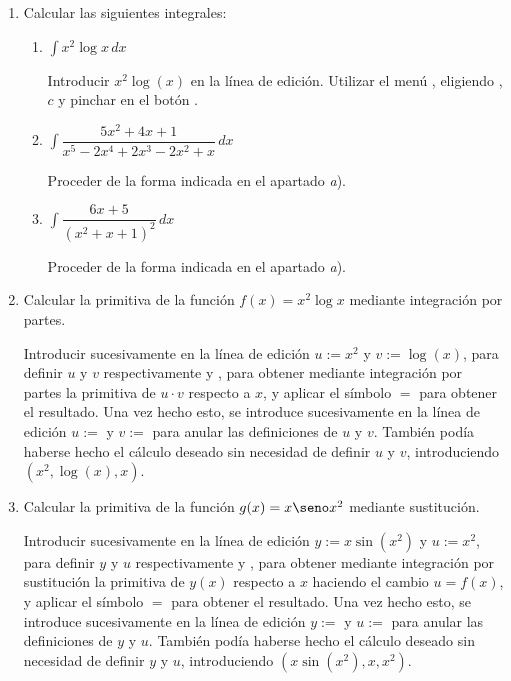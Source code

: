 \begin{enumerate}[leftmargin=*]
\item Calcular las siguientes integrales:

\begin{enumerate}
\item $ \int{x^{2} \log{x}\,dx}$

\begin{indication}
{Introducir $x^{2}\log(x)$ en la línea de edición. Utilizar el menú
, eligiendo ,
 $c$ y pinchar en el botón . }
\end{indication}

\item $ \int{\dfrac{5x^{2}+4x+1}{x^{5}-2x^{4}+2x^{3}-2x^{2}+x}\,dx}$
\begin{indication}
{Proceder de la forma indicada en el apartado \emph{a}). }
\end{indication}

\item $ \int{\dfrac{6x+5}{(x^{2}+x+1)^{2}}\,dx}$
\begin{indication}
{Proceder de la forma indicada en el apartado \emph{a}). }
\end{indication}
\end{enumerate}

\item Calcular la primitiva de la función $f(x)=x^{2}\log x$ mediante integración por partes.
\begin{indication}
{Introducir sucesivamente en la línea de edición $u:=x^{2}$ y
$v:=\log(x)$, para definir $u$ y $v$ respectivamente y
, para obtener mediante integración por
partes la primitiva de $u \cdot v$ respecto a $x$, y aplicar el
símbolo $=$ para obtener el resultado. Una vez hecho esto, se
introduce sucesivamente en la línea de edición $u:=$ y $v:=$ para
anular las definiciones de $u$ y $v$. También podía haberse hecho el
cálculo deseado sin necesidad de definir $u$ y $v$, introduciendo
$(x^2,\log(x),x)$. }
\end{indication}

\item Calcular la primitiva de la función $g(x)=x\seno x^2$ mediante sustitución.
\begin{indication}
{ Introducir sucesivamente en la línea de edición $y:=x\sin(x^{2})$
y $u:=x^{2}$, para definir $y$ y $u$ respectivamente y
, para obtener mediante integración por
sustitución la primitiva de $y(x)$ respecto a $x$ haciendo el cambio
$u=f(x)$, y aplicar el símbolo $=$ para obtener el resultado. Una
vez hecho esto, se introduce sucesivamente en la línea de edición
$y:=$ y $u:=$ para anular las definiciones de $y$ y $u$. También
podía haberse hecho el cálculo deseado sin necesidad de definir $y$
y $u$, introduciendo $(x \sin(x^{2}),x,x^2)$. }
\end{indication}
\end{enumerate}

